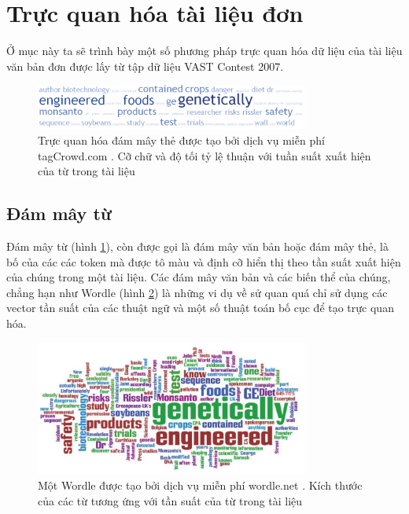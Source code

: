 \documentclass[14pt, a4paper]{article}
\numberwithin{equation}{section}
\numberwithin{figure}{section}
\numberwithin{dl}{section}
\numberwithin{md}{section}
\numberwithin{bd}{section}
\numberwithin{dn}{section}
\numberwithin{hq}{section}
\begin{document}
    \section{Trực quan hóa tài liệu đơn}

    Ở mục này ta sẽ trình bày một số phương pháp trực quan hóa dữ liệu của tài liệu văn bản đơn được lấy từ tập dữ liệu VAST Contest 2007.

    \begin{figure}[h!]
        \centering
        \includegraphics[width=0.8\textwidth]{4.png}
        \caption{Trực quan hóa đám mây thẻ được tạo bởi dịch vụ miễn phí tagCrowd.com \cite{396}.
        Cỡ chữ và độ tối tỷ lệ thuận với tuần suất xuất hiện của từ trong tài liệu}
        \label{fig:4}
    \end{figure}

    \subsection{Đám mây từ}

    Đám mây từ (hình \ref{fig:4}), còn được gọi là đám mây văn bản hoặc đám mây thẻ, là bố của các các token mà được tô màu và định cỡ hiển thị theo tần suất xuất hiện của chúng trong một tài liệu.
    Các đám mây văn bản và các biến thể của chúng, chẳng hạn như Wordle (hình \ref{fig:5}) là những vi dụ về sử quan quá chỉ sử dụng các vector tần suất của các thuật ngữ và một số thuật toán bố cục để tạo trực quan hóa.


    \begin{figure}[h!]
        \centering
        \includegraphics[width=0.8\textwidth]{5.png}
        \caption{Một Wordle được tạo bởi dịch vụ miễn phí wordle.net \cite{118}.
        Kích thước của các từ tương ứng với tần suất của từ trong tài liệu}
        \label{fig:5}
    \end{figure}
\end{document}
